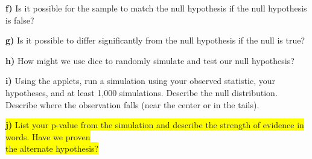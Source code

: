 \documentclass{article}
\newif\ifPrintSolution
\newcommand{\sol}[1]{\ifPrintSolution {\color{blue} #1 } \fi}
\begin{document}
\hspace{0.1in} \textbf{f) } Is it possible for the sample to match the null hypothesis if the null hypothesis is false?

\sol{Yes, it is possible.}

\vspace{0.25in}

\hspace{0.1in} \textbf{g) } Is it possible to differ significantly from the null hypothesis if the null is true?

\sol{Yes, it is possible.}

\vspace{0.25in}

\hspace{0.1in} \textbf{h) } How might we use dice to randomly simulate and test our null hypothesis?

\sol{We might roll a 6-sided dice and select a 5 or 6 to represent a "success," or that someone chose MAJ McD's cookie. We could repeat this \textit{n} times for a sample of size \textit{n}, or alternatively roll \textit{n} dice and count the 5s and 6s.}

\vspace{0.25in}

\hspace{0.1in} \textbf{i) } Using the applets, run a simulation using your observed statistic, your hypotheses, and at least 1,000 simulations. Describe the null distribution. Describe where the observation falls (near the center or in the tails).

\sol{Answers may vary based on class output. There should be a sample size \textit{n} matching the class size, simulations of 1,000 or more, and probability of success of $\frac{1}{3}$. The distribution should be centered on 1/3, roughly normal looking, with variability from 0.08 to 0.67 (ish).}

\vspace{0.25in}

\hspace{0.1in} \colorbox{yellow}{\textbf{j) }  List your p-value from the simulation and describe the strength of evidence in words. Have we proven}\\ \colorbox{yellow}{the alternate hypothesis?}
\end{document}
